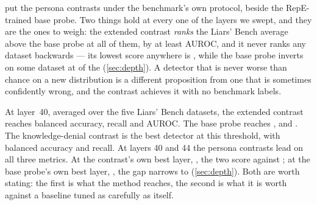  put the persona contrasts under the benchmark's own protocol,
beside the RepE-trained base probe. Two things hold at every one of the  layers we
swept, and they are the ones to weigh: the extended contrast \emph{ranks} the Liars' Bench average
above the base probe at all of them, by at least  AUROC, and it never
ranks any dataset backwards --- its lowest score anywhere is , while the
base probe inverts on some dataset at  of the 
(\cref{sec:depth}). A detector that is never worse than chance on a new distribution is a different
proposition from one that is sometimes confidently wrong, and the contrast achieves it with no
benchmark labels.

At layer~40, averaged over the five Liars' Bench datasets, the
extended contrast reaches  balanced accuracy,  recall and
 AUROC. The base probe reaches , 
and . The knowledge-denial contrast is the best detector at this threshold,
with  balanced accuracy and  recall. At layers 40 and 44
the persona contrasts lead on all three metrics. At the contrast's own best layer,
, the two score  against
; at the base probe's own best layer,
, the gap narrows
to  (\cref{sec:depth}). Both are worth stating: the first is what
the method reaches, the second is what it is worth against a baseline tuned as carefully as itself.

\begin{table}[t]
\centering
\small
\caption{Detection under the Liars' Bench protocol, averaged over its five datasets. The base probe
is the pipeline's RepE-trained probe, and the contrasts are zero-shot. The threshold flags at most
1\% of the Alpaca control. The best value in each layer's block is in bold.}
\label{tab:operating}

\end{table}

